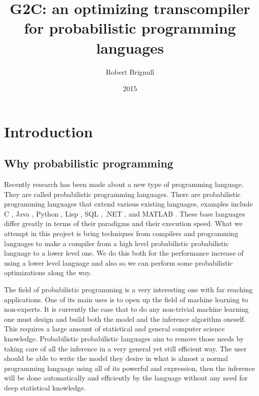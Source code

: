 \documentclass[a4paper]{article}
\title{G2C: an optimizing transcompiler for probabilistic programming languages}
\author{Robert Brignull}
\date{2015}
\begin{document}
\maketitle


\section{Introduction}




\subsection{Why probabilistic programming}

Recently research has been made about a new type of programming language. They are called probabilistic programming languages. There are probabilistic programming languages that extend various existing languages, examples include C \cite{ProbabilisticC}, Java \cite{BLOG}, Python \cite{PyMC}, Lisp \cite{Anglican, Venture, Church}, SQL \cite{PSQL}, .NET \cite{Infer.NET}, and MATLAB \cite{dimple}. These base languages differ greatly in terms of their paradigms and their execution speed. What we attempt in this project is bring techniques from compilers and programming languages to make a compiler from a high level probabilistic probabilistic language to a lower level one. We do this both for the performance increase of using a lower level language and also so we can perform some probabilistic optimizations along the way.

The field of probabilistic programming is a very interesting one with far reaching applications. One of its main uses is to open up the field of machine learning to non-experts. It is currently the case that to do any non-trivial machine learning one must design and build both the model and the inference algorithm oneself. This requires a large amount of statistical and general computer science knowledge. Probabilistic probabilistic languages aim to remove those needs by taking care of all the inference in a very general yet still efficient way. The user should be able to write the model they desire in what is almost a normal programming language using all of its powerful and expression, then the inference will be done automatically and efficiently by the language without any need for deep statistical knowledge.
\end{document}
